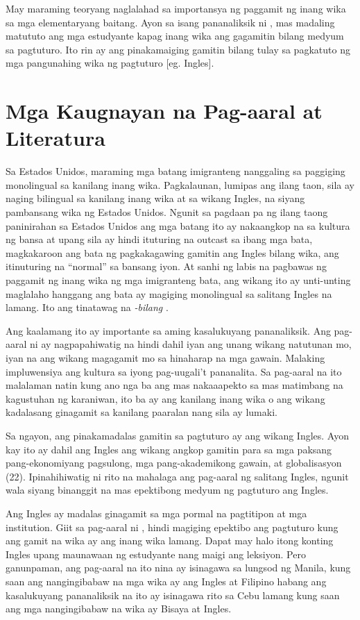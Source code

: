 \documentclass [british, 11pt] {report}
\begin{document}
May maraming teoryang naglalahad sa importansya ng paggamit ng inang wika sa mga
elementaryang baitang. Ayon sa isang pananaliksik ni \cite{BROCKUTNE}, mas
madaling matututo ang mga estudyante kapag inang wika ang gagamitin bilang
medyum sa pagtuturo. Ito rin ay ang pinakamaiging gamitin bilang tulay sa
pagkatuto ng mga pangunahing wika ng pagtuturo [eg. Ingles].
\pagebreak
\section {Mga Kaugnayan na Pag-aaral at Literatura}
Sa Estados Unidos, maraming mga batang imigranteng nanggaling sa paggiging
monolingual sa kanilang inang wika. Pagkalaunan, lumipas ang ilang taon, sila ay
naging bilingual sa kanilang inang wika at sa wikang Ingles, na siyang
pambansang wika ng Estados Unidos. Ngunit sa pagdaan pa ng ilang taong
paninirahan sa Estados Unidos ang mga batang ito ay nakaangkop na sa kultura ng
bansa at upang sila ay hindi ituturing na outcast sa ibang mga bata, magkakaroon
ang bata ng pagkakagawing gamitin ang Ingles bilang wika, ang itinuturing na
``normal'' sa bansang iyon. At sanhi ng labis na pagbawas ng paggamit ng inang
wika ng mga imigranteng bata, ang wikang ito ay unti-unting maglalaho hanggang
ang bata ay magiging monolingual sa salitang Ingles na lamang. Ito ang tinatawag
na \emph{\gls{-bilang}} \parencite{SANTROCK}.

Ang kaalamang ito ay importante sa aming kasalukuyang pananaliksik. Ang
pag-aaral ni \textcite{SANTROCK} ay nagpapahiwatig na hindi dahil iyan ang unang
wikang natutunan mo, iyan na ang wikang magagamit mo sa hinaharap na mga gawain.
Malaking impluwensiya ang kultura sa iyong pag-uugali't pananalita. Sa pag-aaral
na ito malalaman natin kung ano nga ba ang mas nakaaapekto sa mas matimbang na
kagustuhan ng karaniwan, ito ba ay ang kanilang inang wika o ang wikang
kadalasang ginagamit sa kanilang paaralan nang sila ay lumaki.

Sa ngayon, ang pinakamadalas gamitin sa pagtuturo ay ang wikang Ingles. Ayon kay
\textcite{KOO} ito ay dahil ang Ingles ang wikang angkop gamitin para sa mga paksang
pang-ekonomiyang pagsulong, mga pang-akademikong gawain, at globalisasyon (22).
Ipinahihiwatig ni \textcite{KOO} rito na mahalaga ang pag-aaral ng salitang Ingles,
ngunit wala siyang binanggit na mas epektibong medyum ng pagtuturo ang Ingles.

Ang Ingles ay madalas ginagamit sa mga pormal na pagtitipon at mga institution.
Giit sa pag-aaral ni \textcite{BORLONGAN}, hindi magiging epektibo ang pagtuturo
kung ang gamit na wika ay ang inang wika lamang. Dapat may halo itong konting
Ingles upang maunawaan ng estudyante nang maigi ang leksiyon. Pero ganunpaman,
ang pag-aaral na ito nina \textcite{KOO,BORLONGAN} ay isinagawa sa lungsod
ng Manila, kung saan ang nangingibabaw na mga wika ay ang Ingles at Filipino
habang ang kasalukuyang pananaliksik na ito ay isinagawa rito sa Cebu lamang
kung saan ang mga nangingibabaw na wika ay Bisaya at Ingles.
\end{document}
